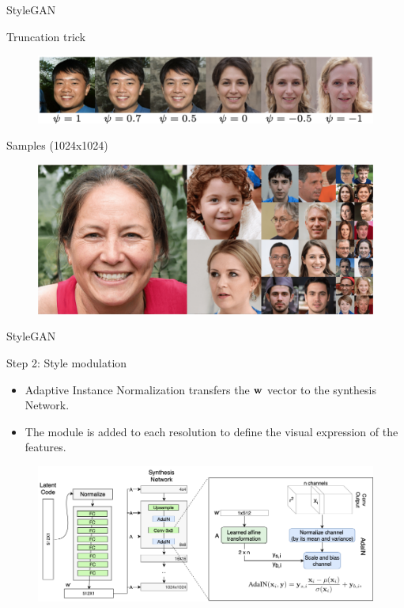 \begin{frame}{StyleGAN}
	\begin{block}{Truncation trick}
		\begin{figure}
			\centering
			\includegraphics[width=0.85\linewidth]{figs/stylegan_truncation}
		\end{figure}
		\vspace{-0.4cm}
	\end{block}
	\begin{block}{Samples (1024x1024)}
		\begin{figure}
			\centering
			\includegraphics[width=0.8\linewidth]{figs/stylegan_samples}
		\end{figure}
	\end{block}
	
\end{frame}
\begin{frame}{StyleGAN}
	\begin{block}{Step 2: Style modulation}
		\begin{itemize}
			\item Adaptive Instance Normalization transfers the $\mathbf{w}$ vector to the synthesis Network.
			\item The module is added to each resolution to define the visual expression of the features.
		\end{itemize}
		\begin{figure}
			\centering
			\includegraphics[width=1.0\linewidth]{figs/stylegan_adain}
		\end{figure}
	\end{block}

\end{frame}
